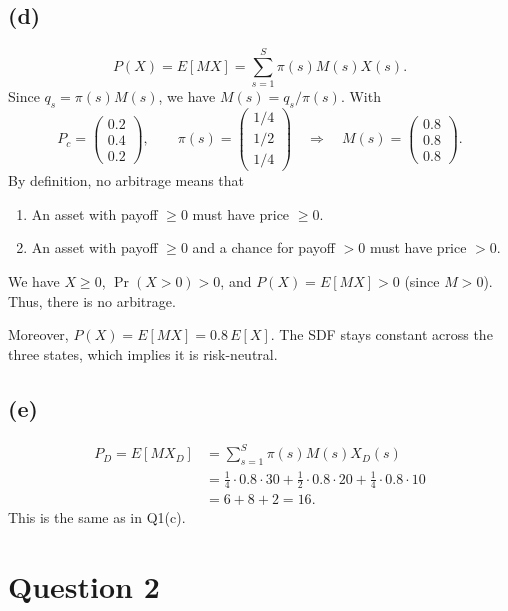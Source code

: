 \documentclass[11pt]{article}
\begin{document}
\subsection*{(d)}

\[
P(X) = E[MX] = \sum_{s=1}^{S} \pi(s) M(s) X(s).
\]
Since $q_s = \pi(s) M(s)$, we have $M(s) = q_s / \pi(s)$. With
\[
P_c = \begin{pmatrix} 0.2 \\ 0.4 \\ 0.2 \end{pmatrix}, \qquad
\pi(s) = \begin{pmatrix} 1/4 \\ 1/2 \\ 1/4 \end{pmatrix}
\quad\Longrightarrow\quad
M(s) = \begin{pmatrix} 0.8 \\ 0.8 \\ 0.8 \end{pmatrix}.
\]
By definition, no arbitrage means that
\begin{enumerate}
  \item An asset with payoff $\geq 0$ must have price $\geq 0$.
  \item An asset with payoff $\geq 0$ and a chance for payoff $> 0$ must have price $> 0$.
\end{enumerate}
We have $X \geq 0$, $\Pr(X > 0) > 0$, and $P(X) = E[MX] > 0$ (since $M > 0$). Thus, there is no arbitrage.

Moreover, $P(X) = E[MX] = 0.8\, E[X]$. The SDF stays constant across the three states, which implies it is risk-neutral.

\subsection*{(e)}

\begin{align*}
P_D = E[M X_D] &= \sum_{s=1}^{S} \pi(s) M(s) X_D(s) \\
&= \tfrac14 \cdot 0.8 \cdot 30 + \tfrac12 \cdot 0.8 \cdot 20 + \tfrac14 \cdot 0.8 \cdot 10 \\
&= 6 + 8 + 2 = 16.
\end{align*}
This is the same as in Q1(c).

\clearpage
\section*{Question 2}
\end{document}
